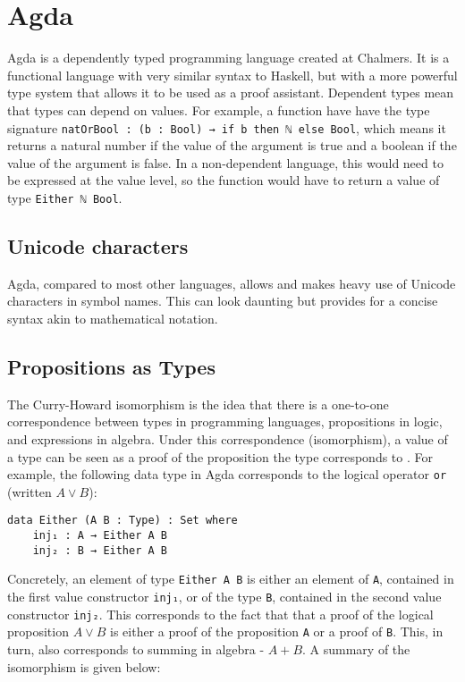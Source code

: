 \section{Agda}
Agda is a dependently typed programming language \cite{agdaWebsite} created at Chalmers.
It is a functional language with very similar syntax to Haskell, but with a more powerful type system that allows it to be used as a proof assistant. 
Dependent types mean that types can depend on values. For example, a function have have the type signature \texttt{natOrBool : (b : Bool) → if b then ℕ else Bool}, which means it returns a natural number if the value of the argument is true and a boolean if the value of the argument is false. In a non-dependent language, this would need to be expressed at the value level, so the function would have to return a value of type \texttt{Either ℕ Bool}.

\subsection{Unicode characters}
Agda, compared to most other languages, allows and makes heavy use of Unicode characters in symbol names. This can look daunting but provides for a concise syntax akin to mathematical notation. 

\subsection{Propositions as Types}
The Curry-Howard isomorphism \cite{propositionastypes} is the idea that there is a one-to-one correspondence between types in programming languages, propositions in logic, and expressions in algebra. Under this correspondence (isomorphism), a value of a type can be seen as a proof of the proposition the type corresponds to \cite{DependentTypesAtWork}. For example, the following data type in Agda corresponds to the logical operator \texttt{or} (written $A \vee B$):

\begin{verbatim}
data Either (A B : Type) : Set where
    inj₁ : A → Either A B
    inj₂ : B → Either A B
\end{verbatim}

Concretely, an element of type \texttt{Either A B} is either an element of \texttt{A}, contained in the first value constructor \texttt{inj₁}, or of the type \texttt{B}, contained in the second value constructor \texttt{inj₂}. This corresponds to the fact that that a proof of the logical proposition $A \vee B$ is either a proof of the proposition \texttt{A} or a proof of \texttt{B}. This, in turn, also corresponds to summing in algebra - $A + B$. A summary of the isomorphism is given below:

